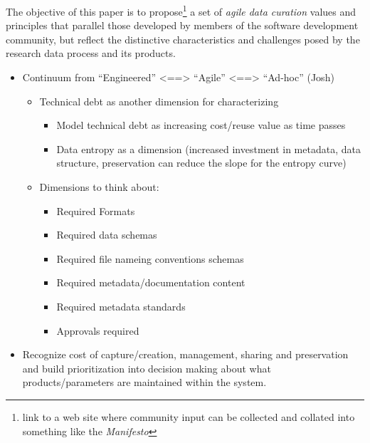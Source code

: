 \documentclass[paper]{ijdc-v9}
\begin{document}
The objective of this paper is to propose\footnote{link to a web site
  where community input can be collected and collated into something
  like the \emph{Manifesto}} a set of \emph{agile data curation} values
and principles that parallel those developed by members of the software
development community, but reflect the distinctive characteristics and
challenges posed by the research data process and its products.

\begin{itemize}
\itemsep1pt\parskip0pt
\item
  Continuum from ``Engineered'' \textless{}==\textgreater{} ``Agile''
  \textless{}==\textgreater{} ``Ad-hoc'' (Josh)

  \begin{itemize}
  \itemsep1pt\parskip0pt
  \item
    Technical debt as another dimension for characterizing

    \begin{itemize}
    \itemsep1pt\parskip0pt
    \item
      Model technical debt as increasing cost/reuse value as time passes
    \item
      Data entropy as a dimension (increased investment in metadata,
      data structure, preservation can reduce the slope for the entropy
      curve)
    \end{itemize}
  \item
    Dimensions to think about:

    \begin{itemize}
    \itemsep1pt\parskip0pt
    \item
      Required Formats
    \item
      Required data schemas
    \item
      Required file nameing conventions schemas
    \item
      Required metadata/documentation content
    \item
      Required metadata standards
    \item
      Approvals required
    \end{itemize}
  \end{itemize}
\item
  Recognize cost of capture/creation, management, sharing and
  preservation and build prioritization into decision making about what
  products/parameters are maintained within the system.
\end{itemize}
\end{document}
